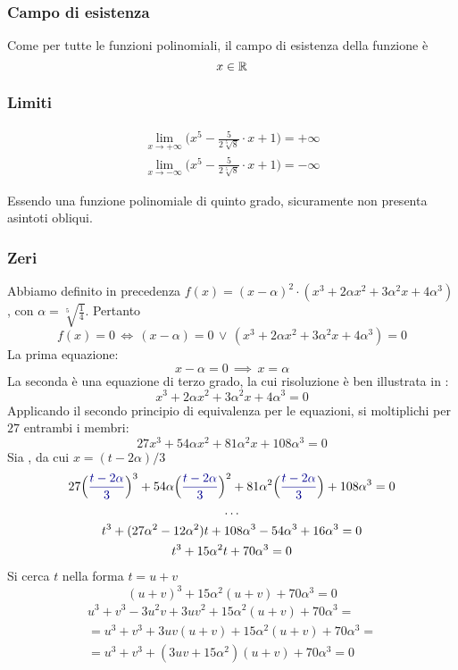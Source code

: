 
\subsubsection*{Campo di esistenza}

Come per tutte le funzioni polinomiali, il campo di esistenza della funzione è 
\[
x\in\mathbb{R}
\]

\subsubsection*{Limiti}

\begin{gather*}
\lim_{x\to+\infty}\Big(x^5-\frac{5}{2\sqrt[5]{8}}\cdot x+1\Big)=+\infty\\
\lim_{x\to-\infty}\Big(x^5-\frac{5}{2\sqrt[5]{8}}\cdot x+1\Big)=-\infty
\end{gather*}

Essendo una funzione polinomiale di quinto grado, sicuramente non presenta asintoti obliqui.

\subsubsection*{Zeri}

Abbiamo definito in precedenza $f(x)=(x-\alpha)^2\cdot (x^3+2\alpha x^2+3\alpha^2x+4\alpha^3)$, con $\alpha=\sqrt[5]{\frac{1}{4}}$. Pertanto
\[
f(x)=0\,\iff\, (x-\alpha)=0\,\lor\,(x^3+2\alpha x^2+3\alpha^2x+4\alpha^3)=0
\]
La prima equazione:
\[x-\alpha=0\,\implies\, x=\alpha\]
La seconda è una equazione di terzo grado, la cui risoluzione è ben illustrata in \textcite[1-4]{eq:ter}:
\[x^3+2\alpha x^2+3\alpha^2x+4\alpha^3=0\] 
Applicando il secondo principio di equivalenza per le equazioni, si moltiplichi per $27$ entrambi i membri:
\[27x^3+54\alpha x^2+81\alpha^2 x + 108 \alpha^3=0\]
Sia , da cui $x=(t-2\alpha)/3$
\begin{gather*}
27\Big(\blue{\frac{t-2\alpha}{3}}\Big)^3+54\alpha \Big(\blue{\frac{t-2\alpha}{3}}\Big)^2+81\alpha^2 \Big(\blue{\frac{t-2\alpha}{3}}\Big) + 108 \alpha^3=0\\
\dots\\
t^3+(27\alpha^2-12\alpha^2)t+108\alpha^3-54\alpha^3+16\alpha^3=0\\
t^3+15\alpha^2t+70\alpha^3=0
\end{gather*}
Si cerca $t$ nella forma $t=u+v$
\[
(u+v)^3+15\alpha^2(u+v)+70\alpha^3=0
\]
\begin{multline*}
u^3+v^3-3u^2v+3uv^2+15\alpha^2(u+v)+70\alpha^3=\\
=u^3+v^3+3uv(u+v)+15\alpha^2(u+v)+70\alpha^3=\\
=u^3+v^3+(3uv+15\alpha^2)(u+v)+70\alpha^3=0
\end{multline*}

